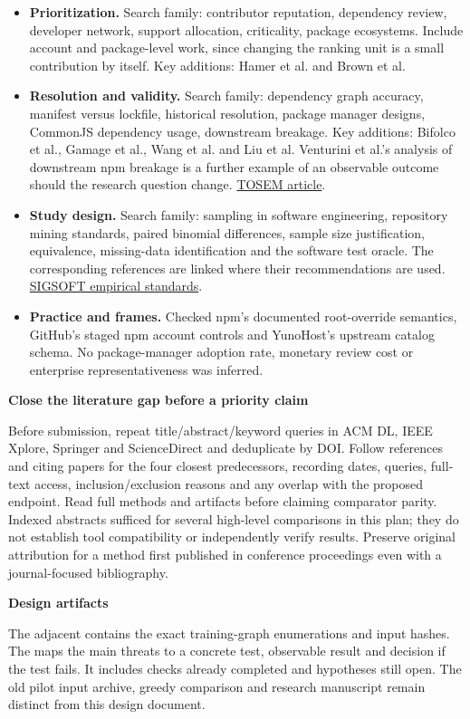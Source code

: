 \documentclass[11pt,a4paper]{article}
\newcommand{\hd}[1]{\par\textbf{\color{accent}#1}\par\nopagebreak}
\newcommand{\doi}[2]{\href{https://doi.org/#1}{#2}}
\newcommand{\code}[1]{\texttt{\detokenize{#1}}}
\begin{document}
\begin{itemize}
\item \textbf{Prioritization.} Search family: contributor reputation, dependency review, developer network, support allocation, criticality, package ecosystems. Include account and package-level work, since changing the ranking unit is a small contribution by itself. Key additions: Hamer et al. and Brown et al.
\item \textbf{Resolution and validity.} Search family: dependency graph accuracy, manifest versus lockfile, historical resolution, package manager designs, CommonJS dependency usage, downstream breakage. Key additions: Bifolco et al., Gamage et al., Wang et al. and Liu et al. Venturini et al.'s analysis of downstream npm breakage is a further example of an observable outcome should the research question change. \doi{10.1145/3576037}{TOSEM article}.
\item \textbf{Study design.} Search family: sampling in software engineering, repository mining standards, paired binomial differences, sample size justification, equivalence, missing-data identification and the software test oracle. The corresponding references are linked where their recommendations are used. \href{https://www2.sigsoft.org/EmpiricalStandards/docs/standards}{SIGSOFT empirical standards}.
\item \textbf{Practice and frames.} Checked npm's documented root-override semantics, GitHub's staged npm account controls and YunoHost's upstream catalog schema. No package-manager adoption rate, monetary review cost or enterprise representativeness was inferred.
\end{itemize}

\hd{Close the literature gap before a priority claim}
Before submission, repeat title/abstract/keyword queries in ACM DL, IEEE Xplore, Springer and ScienceDirect and deduplicate by DOI. Follow references and citing papers for the four closest predecessors, recording dates, queries, full-text access, inclusion/exclusion reasons and any overlap with the proposed endpoint. Read full methods and artifacts before claiming comparator parity. Indexed abstracts sufficed for several high-level comparisons in this plan; they do not establish tool compatibility or independently verify results. Preserve original attribution for a method first published in conference proceedings even with a journal-focused bibliography.

\hd{Design artifacts}
The adjacent \code{design_diagnostics.json} contains the exact training-graph enumerations and input hashes. The \code{test_register.csv} maps the main threats to a concrete test, observable result and decision if the test fails. It includes checks already completed and hypotheses still open. The old pilot input archive, greedy comparison and research manuscript remain distinct from this design document.
\end{document}
